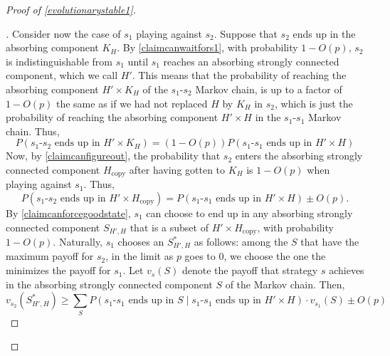 \documentclass[12pt]{article}
\theoremstyle{definition}
\theoremstyle{remark}
\newenvironment{subproof}[1][\proofname]{%
  \renewcommand{\qedsymbol}{$\blacksquare$}%
  \begin{proof}[#1]%
}{%
  \end{proof}%
}
\begin{document}
\begin{proof}[Proof of \cref{evolutionarystable1}]
\begin{subproof}
        Consider now the case of $s_1$ playing against $s_2$. Suppose that $s_2$ ends up in the absorbing component $K_H$. By \cref{claimcanwaitfors1}, with probability $1 - O(p)$, $s_2$ is indistinguishable from $s_1$ until $s_1$ reaches an absorbing strongly connected component, which we call $H'$.         
        This means that the probability of reaching the absorbing component $H' \times K_H$ of the $s_1$-$s_2$ Markov chain, is up to a factor of $1 - O(p)$ the same as if we had not replaced $H$ by $K_H$ in $s_2$, which is just the probability of reaching the absorbing component $H' \times H$ in the $s_1$-$s_1$ Markov chain. Thus, 
        \begin{equation*}
          P(\text{$s_1$-$s_2$ ends up in $H' \times K_H$}) = (1 - O(p)) P(\text{$s_1$-$s_1$ ends up in $H' \times H$})
        \end{equation*}
        Now, by \cref{claimcanfigureout}, the probability that $s_2$ enters the absorbing strongly connected component $H_\text{copy}$ after having gotten to $K_H$ is $1 - O(p)$ when playing against $s_1$. Thus,
        \begin{equation}
          \label{equationhhcopy}
          P(\text{$s_1$-$s_2$ ends up in $H' \times H_\text{copy}$}) = P(\text{$s_1$-$s_1$ ends up in $H' \times H$}) \pm O(p).
        \end{equation}
        By \cref{claimcanforcegoodstate}, $s_1$ can choose to end up in any absorbing strongly connected component $S_{H', H}$ that is a subset of $H' \times H_\text{copy}$, with probability $1 - O(p)$. 
        Naturally, $s_1$ chooses an $S_{H', H}^*$ as follows: among the $S$ that have the maximum payoff for $s_2$, in the limit as $p$ goes to 0, we choose the one the minimizes the payoff for $s_1$.
        Let $v_{s}(S)$ denote the payoff that strategy $s$ achieves in the absorbing strongly connected component $S$ of the Markov chain. Then,
        \begin{equation}
          \label{imtoootired}
          v_{s_2}(S_{H', H}^*) \geq \sum_{S} P(\text{$s_1$-$s_1$ ends up in $S$} \mid \text{$s_1$-$s_1$ ends up in $H' \times H$}) \cdot v_{s_1}(S) \pm O(p)
        \end{equation}

\end{subproof}
\end{proof}
\end{document}
